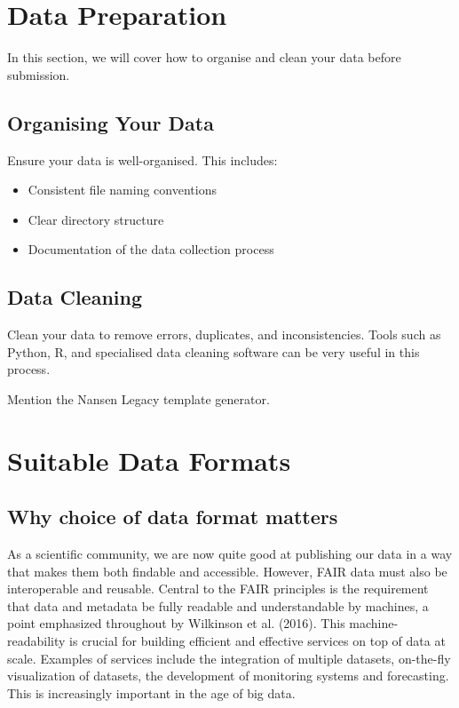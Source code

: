 \documentclass[a4paper,12pt]{article}
\begin{document}
\section{Data Preparation}
\label{sec:data-preparation}
In this section, we will cover how to organise and clean your data before submission.

\subsection{Organising Your Data}
Ensure your data is well-organised. This includes:
\begin{itemize}
    \item Consistent file naming conventions
    \item Clear directory structure
    \item Documentation of the data collection process
\end{itemize}

\subsection{Data Cleaning}
Clean your data to remove errors, duplicates, and inconsistencies. Tools such as Python, R, and specialised data cleaning software can be very useful in this process.

Mention the Nansen Legacy template generator.

\section{Suitable Data Formats}
\label{sec:suitable-data-formats}

\subsection{Why choice of data format matters}

As a scientific community, we are now quite good at publishing our data in a way that makes them both findable and accessible. However, FAIR data must also be interoperable and reusable. Central to the FAIR principles is the requirement that data and metadata be fully readable and understandable by machines, a point emphasized throughout by Wilkinson et al. (2016). This machine-readability is crucial for building efficient and effective services on top of data at scale. Examples of services include the integration of multiple datasets, on-the-fly visualization of datasets, the development of monitoring systems and forecasting. This is increasingly important in the age of big data.
\end{document}
